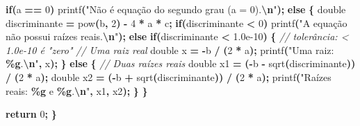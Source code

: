 \documentclass[
  11pt,
  a4paper,
]{scrbook}
\newenvironment{Shaded}{\begin{snugshade}}{\end{snugshade}}
\newcommand{\CommentTok}[1]{\textcolor[rgb]{0.56,0.35,0.01}{\textit{#1}}}
\newcommand{\ControlFlowTok}[1]{\textcolor[rgb]{0.13,0.29,0.53}{\textbf{#1}}}
\newcommand{\DataTypeTok}[1]{\textcolor[rgb]{0.13,0.29,0.53}{#1}}
\newcommand{\DecValTok}[1]{\textcolor[rgb]{0.00,0.00,0.81}{#1}}
\newcommand{\FloatTok}[1]{\textcolor[rgb]{0.00,0.00,0.81}{#1}}
\newcommand{\NormalTok}[1]{#1}
\newcommand{\OperatorTok}[1]{\textcolor[rgb]{0.81,0.36,0.00}{\textbf{#1}}}
\newcommand{\SpecialCharTok}[1]{\textcolor[rgb]{0.81,0.36,0.00}{\textbf{#1}}}
\newcommand{\StringTok}[1]{\textcolor[rgb]{0.31,0.60,0.02}{#1}}
\begin{document}
\begin{Shaded}
\begin{Highlighting}[]
    \ControlFlowTok{if}\OperatorTok{(}\NormalTok{a }\OperatorTok{==} \DecValTok{0}\OperatorTok{)}
\NormalTok{        printf}\OperatorTok{(}\StringTok{"Não é equação do segundo grau (a = 0).}\SpecialCharTok{\textbackslash{}n}\StringTok{"}\OperatorTok{);}
    \ControlFlowTok{else} \OperatorTok{\{}
        \DataTypeTok{double}\NormalTok{ discriminante }\OperatorTok{=}\NormalTok{ pow}\OperatorTok{(}\NormalTok{b}\OperatorTok{,} \DecValTok{2}\OperatorTok{)} \OperatorTok{{-}} \DecValTok{4} \OperatorTok{*}\NormalTok{ a }\OperatorTok{*}\NormalTok{ c}\OperatorTok{;}
        \ControlFlowTok{if}\OperatorTok{(}\NormalTok{discriminante }\OperatorTok{\textless{}} \DecValTok{0}\OperatorTok{)}
\NormalTok{            printf}\OperatorTok{(}\StringTok{"A equação não possui raízes reais.}\SpecialCharTok{\textbackslash{}n}\StringTok{"}\OperatorTok{);}
        \ControlFlowTok{else} \ControlFlowTok{if}\OperatorTok{(}\NormalTok{discriminante }\OperatorTok{\textless{}} \FloatTok{1.0e{-}10}\OperatorTok{)} \OperatorTok{\{}  \CommentTok{// tolerância: \textless{} 1.0e{-}10 é "zero"}
            \CommentTok{// Uma raiz real}
            \DataTypeTok{double}\NormalTok{ x }\OperatorTok{=} \OperatorTok{{-}}\NormalTok{b }\OperatorTok{/} \OperatorTok{(}\DecValTok{2} \OperatorTok{*}\NormalTok{ a}\OperatorTok{);}
\NormalTok{            printf}\OperatorTok{(}\StringTok{"Uma raiz: }\SpecialCharTok{\%g}\StringTok{.}\SpecialCharTok{\textbackslash{}n}\StringTok{"}\OperatorTok{,}\NormalTok{ x}\OperatorTok{);}
        \OperatorTok{\}}
        \ControlFlowTok{else} \OperatorTok{\{}
            \CommentTok{// Duas raízes reais}
            \DataTypeTok{double}\NormalTok{ x1 }\OperatorTok{=} \OperatorTok{({-}}\NormalTok{b }\OperatorTok{{-}}\NormalTok{ sqrt}\OperatorTok{(}\NormalTok{discriminante}\OperatorTok{))} \OperatorTok{/} \OperatorTok{(}\DecValTok{2} \OperatorTok{*}\NormalTok{ a}\OperatorTok{);}
            \DataTypeTok{double}\NormalTok{ x2 }\OperatorTok{=} \OperatorTok{({-}}\NormalTok{b }\OperatorTok{+}\NormalTok{ sqrt}\OperatorTok{(}\NormalTok{discriminante}\OperatorTok{))} \OperatorTok{/} \OperatorTok{(}\DecValTok{2} \OperatorTok{*}\NormalTok{ a}\OperatorTok{);}
\NormalTok{            printf}\OperatorTok{(}\StringTok{"Raízes reais: }\SpecialCharTok{\%g}\StringTok{ e }\SpecialCharTok{\%g}\StringTok{.}\SpecialCharTok{\textbackslash{}n}\StringTok{"}\OperatorTok{,}\NormalTok{ x1}\OperatorTok{,}\NormalTok{ x2}\OperatorTok{);}
        \OperatorTok{\}}
    \OperatorTok{\}}

    \ControlFlowTok{return} \DecValTok{0}\OperatorTok{;}
\OperatorTok{\}}
\end{Highlighting}
\end{Shaded}
\end{document}
